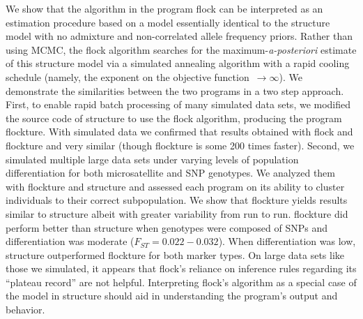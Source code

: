 
      We show that the algorithm in the program {\sc flock} \citep{Duc&Tur2009} can be
interpreted as an estimation procedure based on 
a model essentially identical to the {\sc structure} 
\citep{Pritchardetal2000} model with no admixture and non-correlated 
allele frequency priors. Rather than using MCMC, the {\sc flock} algorithm 
searches for the maximum-{\em a-posteriori}
estimate of this {\sc structure} model via a simulated 
annealing algorithm with a rapid cooling 
schedule (namely, the exponent on the objective function~$\rightarrow \infty$).  We 
demonstrate the similarities between the two programs in a two step approach. First,
to enable rapid batch processing of many simulated data sets,
we modified the source code of  {\sc structure} to use the {\sc flock} algorithm, producing
the program {\sc flockture}. With simulated data we confirmed that results obtained with
{\sc flock}  and {\sc flockture} and very similar (though flockture is some 200 times faster). 
Second, we simulated multiple large data sets under varying 
levels of population differentiation for both microsatellite and SNP genotypes. We analyzed them
with {\sc flockture} and {\sc structure} and assessed each program on its ability to cluster
individuals to their correct subpopulation.  We show that
{\sc flockture} yields results similar to {\sc structure} albeit with greater 
variability from run to run. {\sc flockture} did perform better than {\sc structure} 
when genotypes were composed of SNPs and differentiation was moderate 
($F_{ST}=0.022-0.032$). When differentiation was low, {\sc structure} outperformed {\sc flockture}
for both marker types. On large data sets like those we simulated, it appears that 
{\sc flock}'s reliance on inference rules regarding its ``plateau record'' are not helpful. 
Interpreting {\sc flock}'s algorithm as a special case of the model in 
{\sc structure} should aid in understanding the program's output and behavior. 

